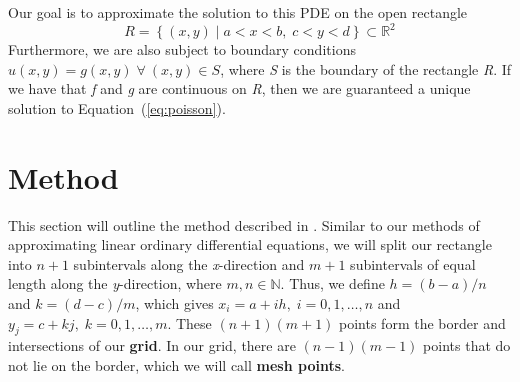 \documentclass[12pt, titlepage]{article}
\begin{document}
    Our goal is to approximate the solution to this PDE on the open rectangle 
    \begin{equation*}
        R = \left\{(x,y)\; |\; a < x < b,\; c < y < d\right\} \subset \mathbb{R}^2
    \end{equation*}
    Furthermore, we are also subject to boundary conditions $u(x,y) = g(x,y)\;\forall\:(x,y)\in S$, where \textit{S} is
    the boundary of the rectangle \textit{R}. If we have that \textit{f} and \textit{g} are continuous on \textit{R}, then 
    we are guaranteed a unique solution to Equation~(\ref{eq:poisson}).
    \section{Method}
    This section will outline the method described in \cite{burden_faires_2011}. Similar to our methods of approximating linear ordinary differential equations, we will split our rectangle into
    $n+1$ subintervals along the \textit{x}-direction and $m+1$ subintervals of equal length along the \textit{y}-direction, where $m,n \in \mathbb{N}$.
    Thus, we define $h=(b-a)/n$ and $k=(d-c)/m$, which gives $x_i = a  + ih,\; i=0,1,\dots,n$ and $y_j = c + kj, \; k=0,1,\dots,m$. These $(n+1)(m+1)$ points
    form the border and intersections of our \textbf{grid}. In our grid, there are $(n-1)(m-1)$ points that do not lie on the border, which we will call \textbf{mesh points}.
\end{document}
